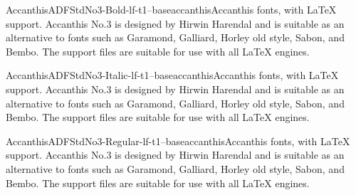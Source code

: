 \documentclass{ddltxtyp}
\begin{document}

\begin{package}{AccanthisADFStdNo3-Bold-lf-t1--base}{accanthis}{Accanthis fonts, with {\LaTeX} support.}
Accanthis No.3 is designed by Hirwin Harendal and is suitable
as an alternative to fonts such as Garamond, Galliard, Horley
old style, Sabon, and Bembo. The support files are suitable for
use with all {\LaTeX} engines.
\end{package}
\begin{package}{AccanthisADFStdNo3-Italic-lf-t1--base}{accanthis}{Accanthis fonts, with {\LaTeX} support.}
Accanthis No.3 is designed by Hirwin Harendal and is suitable
as an alternative to fonts such as Garamond, Galliard, Horley
old style, Sabon, and Bembo. The support files are suitable for
use with all {\LaTeX} engines.
\end{package}
\begin{package}{AccanthisADFStdNo3-Regular-lf-t1--base}{accanthis}{Accanthis fonts, with {\LaTeX} support.}
Accanthis No.3 is designed by Hirwin Harendal and is suitable
as an alternative to fonts such as Garamond, Galliard, Horley
old style, Sabon, and Bembo. The support files are suitable for
use with all {\LaTeX} engines.
\end{package}
\end{document}
